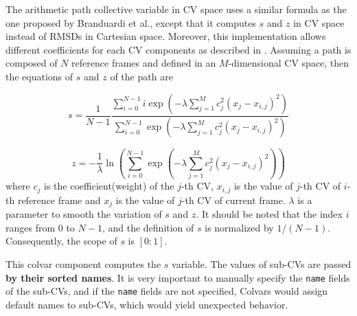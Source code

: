 
The arithmetic path collective variable in CV space uses a similar formula as 
the one proposed by Branduardi\cite{Branduardi2007} et al., except that it 
computes $s$ and $z$ in CV space instead of RMSDs in Cartesian space. Moreover, 
this implementation allows different coefficients for each CV components as 
described in \cite{Hovan2019}. Assuming a path is composed of $N$ reference 
frames and defined in an $M$-dimensional CV space, then the equations of $s$ 
and $z$ of the path are

\begin{equation}
s = \frac{1}{N-1}\frac{\sum_{i=0}^{N-1} i \exp\left(-\lambda\sum_{j=1}^{M} 
c_j^2 \left(x_j-x_{i,j}\right)^2\right)}{\sum_{i=0}^{N-1} 
\exp\left(-\lambda\sum_{j=1}^{M} c_j^2 \left(x_j-x_{i,j}\right)^2\right)}
\label{eq:apath_s}
\end{equation}

\begin{equation}
z = -\frac{1}{\lambda} \ln \left(\sum_{i=0}^{N-1} 
\exp\left(-\lambda\sum_{j=1}^{M} c_j^2 \left(x_j-x_{i,j}\right)^2 \right)\right)
\label{eq:apath_z}
\end{equation}
where $c_j$ is the coefficient(weight) of the $j$-th CV, $x_{i,j}$ is the value 
of $j$-th CV of $i$-th reference frame and $x_{j}$ is the value of $j$-th CV of 
current frame. $\lambda$ is a parameter to smooth the variation of $s$ and $z$. 
It should be noted that the index $i$ ranges from $0$ to $N-1$, and the 
definition of $s$ is normalized by $1/(N-1)$. Consequently, the scope of $s$ is 
$[0:1]$.


This colvar component computes the $s$ variable. The values of sub-CVs are passed \textbf{by their sorted names}. It is very important to manually specify the \texttt{name} fields of the sub-CVs, and if the \texttt{name} fields are not specified, Colvars would assign default names to sub-CVs, which would yield unexpected behavior.


